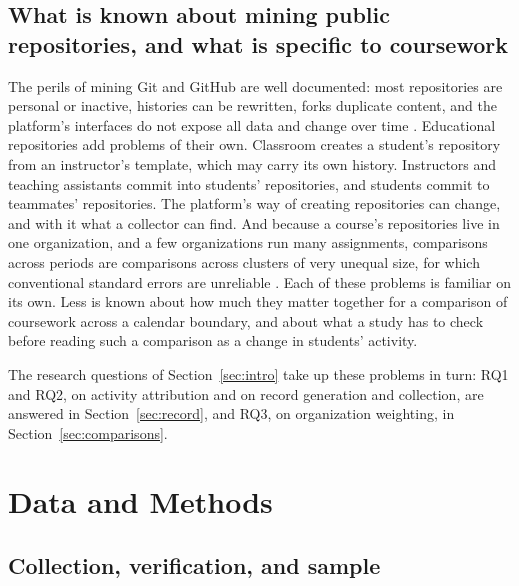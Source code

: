 \documentclass[acmsmall,screen,review,anonymous]{acmart}
\begin{document}
\subsection{What is known about mining public repositories, and what is specific to coursework}

The perils of mining Git and GitHub are well documented: most repositories are personal or inactive, histories can be rewritten, forks duplicate content, and the platform's interfaces do not expose all data and change over time \citep{bird2009promises, kalliamvakou2016promises}. Educational repositories add problems of their own. Classroom creates a student's repository from an instructor's template, which may carry its own history. Instructors and teaching assistants commit into students' repositories, and students commit to teammates' repositories. The platform's way of creating repositories can change, and with it what a collector can find. And because a course's repositories live in one organization, and a few organizations run many assignments, comparisons across periods are comparisons across clusters of very unequal size, for which conventional standard errors are unreliable \citep{cameron2008bootstrap, cameron2015practitioner}. Each of these problems is familiar on its own. Less is known about how much they matter together for a comparison of coursework across a calendar boundary, and about what a study has to check before reading such a comparison as a change in students' activity.

The research questions of Section~\ref{sec:intro} take up these problems in turn: RQ1 and RQ2, on activity attribution and on record generation and collection, are answered in Section~\ref{sec:record}, and RQ3, on organization weighting, in Section~\ref{sec:comparisons}.
\section{Data and Methods}
\label{sec:methods}

\subsection{Collection, verification, and sample}
\label{sec:data}
\end{document}

